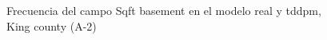 \begin{figure}[H]
    \centering
    
    \caption{Frecuencia del campo Sqft basement en el modelo real y tddpm, King county (A-2)}
    \label{frecuency-tddpm-sqft basement}
\end{figure}